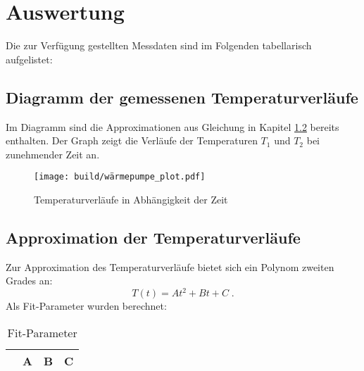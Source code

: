\section{Auswertung} \label{sec:Auswertung}
Die zur Verfügung gestellten Messdaten sind im Folgenden tabellarisch aufgelistet:


\newpage
\subsection{Diagramm der gemessenen Temperaturverläufe} %
Im Diagramm sind die Approximationen aus Gleichung in Kapitel \ref{sec:approx} bereits enthalten.
Der Graph zeigt die Verläufe der Temperaturen $T_1$ und $T_2$ bei zunehmender Zeit an.

\begin{figure}
  \centering
  \texttt{[image: build/wärmepumpe\_plot.pdf]}
  \caption{Temperaturverläufe in Abhängigkeit der Zeit}
  \label{fig:plot}
\end{figure}

\subsection{Approximation der Temperaturverläufe} \label{sec:approx} %
Zur Approximation des Temperaturverläufe bietet sich ein Polynom zweiten Grades an:
\[
T(t) = At^2 + Bt + C \; .
\]
Als Fit-Parameter wurden berechnet:

\begin{table}
\centering
\caption{Fit-Parameter}
\label{tab:fit_params}
\begin{tabular}{c c c c}
\toprule
 & A & B & C \\
\midrule

\bottomrule
\end{tabular}
\end{table}

